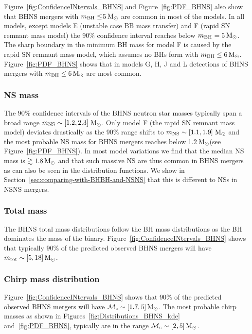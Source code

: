 \documentclass[twocolumn]{aastex63}
\newcommand\bhnsSingle{BHNS\xspace}
\newcommand{\Msun}{\ensuremath{\,\rm{M}_{\odot}}\xspace}
\newcommand{\mnsf}{\ensuremath{m_{\rm{NS}}}\xspace}
\newcommand{\mbhf}{\ensuremath{m_{\rm{BH}}}\xspace}
\newcommand{\mtotf}{\ensuremath{m_{\rm{tot}}}\xspace}
\newcommand{\mchirpf}{\ensuremath{{\mathcal{M}}_{\rm{c}}}\xspace}
\begin{document}
Figure~\ref{fig:ConfidenceINtervals_BHNS} and Figure~\ref{fig:PDF_BHNS} also show that \bhnsSingle mergers with  $\mbhf \leq$5\Msun are  common  in most of the models. In all models, except models E (unstable case BB mass transfer) and F (rapid SN remnant mass model) the 90$\%$ confidence interval reaches below \mbhf $=5$\Msun. The sharp boundary in the minimum \ac{BH} mass for model F is caused by the rapid \ac{SN} remnant mass model, which assumes no \acp{BH} form with $\mbhf \leq 6\Msun$. Figure~\ref{fig:PDF_BHNS} shows that in models G, H, J and L detections of  \bhnsSingle mergers with $\mbhf \leq 6\Msun$   are most common.   


\subsubsection{NS mass}
The $90\%$ confidence intervals of the \bhnsSingle neutron star masses typically span a broad range  $\mnsf \sim [1.2, 2.3]$\Msun. Only  model  F (the rapid SN remnant mass model)  deviates drastically as the $90\%$ range shifts to $\mnsf \sim [1.1, 1.9]$\Msun and the most probable  \ac{NS} mass for \bhnsSingle mergers reaches below 1.2\Msun (see Figure~\ref{fig:PDF_BHNS}).
In most model variations we find  that the median \ac{NS} mass  is  $\gtrsim 1.8\Msun$ and that such massive \ac{NS} are thus common in \bhnsSingle mergers as can also be seen in the distribution functions. We show in Section~\ref{sec:comparing-with-BHBH-and-NSNS} that this is different to \acp{NS} in \ac{NSNS} mergers. 



\subsubsection{Total mass}
The \bhnsSingle total mass distributions follow the  \ac{BH} mass distributions as the \ac{BH} dominates the mass of the binary. Figure~\ref{fig:ConfidenceINtervals_BHNS}  shows that typically  $90\%$ of the predicted observed \bhnsSingle mergers will have $\mtotf  \sim [5, 18]\Msun$. 



\subsubsection{Chirp mass distribution}
Figure~\ref{fig:ConfidenceINtervals_BHNS} shows that  $90\%$ of the predicted observed \bhnsSingle mergers will have  $\mchirpf  \sim [1.7, 5]\Msun$.  The most probable chirp masses as shown in  Figures~\ref{fig:Distributions_BHNS_kde} and~\ref{fig:PDF_BHNS}, typically are in the range $\mchirpf \sim [2, 5]\Msun$. 
\end{document}
